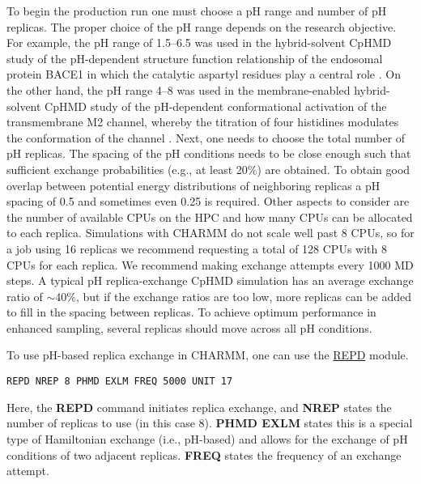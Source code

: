 To begin the production run one must choose a pH range and number of pH replicas. 
The proper choice of the pH range depends on the research objective.
For example, the pH range of 1.5--6.5 was used in the hybrid-solvent CpHMD study
of the pH-dependent structure function relationship of the endosomal protein BACE1
in which the catalytic aspartyl residues play a central role \cite{Ellis_Shen_2015_J.Am.Chem.Soc.}.
On the other hand, the pH range 4--8 was used in the membrane-enabled hybrid-solvent 
CpHMD study of the pH-dependent conformational activation of the transmembrane M2 channel,
whereby the titration of four histidines modulates the conformation of the channel \cite{Chen_Shen_2016_J.Phys.Chem.Lett.}.
Next, one needs to choose the total number of pH replicas. 
The spacing of the pH conditions needs to be close enough such that sufficient exchange 
probabilities (e.g., at least 20$\%$) are obtained.
To obtain good overlap between potential energy distributions of neighboring replicas
a pH spacing of 0.5 and sometimes even 0.25 is required. 
Other aspects to consider are the number of available CPUs on the HPC and how many CPUs can be 
allocated to each replica. 
Simulations with CHARMM do not scale well past 8 CPUs, so for a job using 16 replicas
we recommend requesting a total of 128 CPUs with 8 CPUs for each replica. 
We recommend making exchange attempts every 1000 MD steps.
A typical pH replica-exchange CpHMD simulation has an average exchange ratio of $\sim$40$\%$, 
but if the exchange ratios are too low, more replicas can be added to fill in the spacing 
between replicas.
To achieve optimum performance in enhanced sampling, several replicas should move 
across all pH conditions.

To use pH-based replica exchange in CHARMM, one can use the 
\href{https://hpc.nih.gov/apps/charmm/c39b2html/repdstr.html}{REPD} module.
%
\begin{lstlisting}
REPD NREP 8 PHMD EXLM FREQ 5000 UNIT 17
\end{lstlisting}
%
Here, the \textbf{REPD} command initiates replica exchange, and \textbf{NREP} states the number of replicas to use
(in this case 8). 
\textbf{PHMD EXLM} states this is a special type of Hamiltonian exchange (i.e., pH-based) and allows for the exchange of pH conditions of two adjacent replicas.
\textbf{FREQ} states the frequency of an exchange attempt. 


